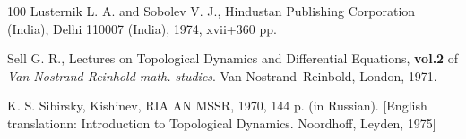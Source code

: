 \documentclass{amsart}%
\begin{document}
\begin{thebibliography}{100}
 Lusternik L. A. and Sobolev V. J.,
\newblock Hindustan Publishing Corporation (India), Delhi 110007
(India), 1974, xvii+360 pp.

Sell G. R.,
\newblock  Lectures on Topological Dynamics and Differential Equations,
{\bf vol.2} of {\it Van Nostrand Reinhold math. studies}.
\newblock Van Nostrand--Reinbold, London, 1971.

K. S. Sibirsky,
\newblock Kishinev, RIA AN MSSR, 1970, 144 p. (in Russian). [English
translationn: Introduction to Topological Dynamics. Noordhoff,
Leyden, 1975]


\end{thebibliography}
\end{document}
